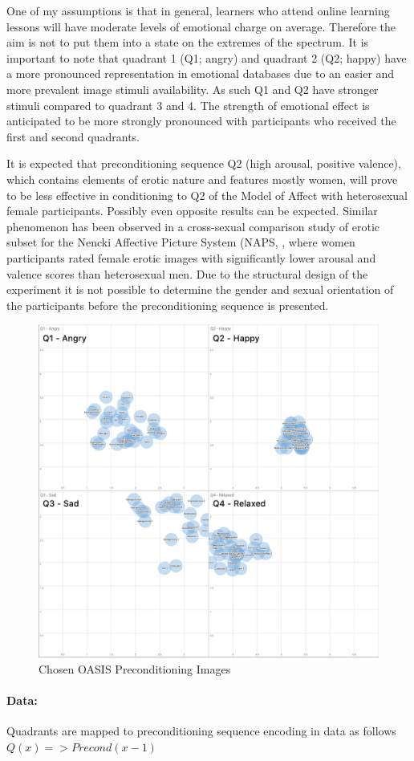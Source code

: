 One of my assumptions is that in general, learners who attend online learning lessons will have moderate levels of emotional charge on average. Therefore the aim is not to put them into a state on the extremes of the spectrum. It is important to note that quadrant 1 (Q1; angry) and quadrant 2 (Q2; happy) have a more pronounced representation in emotional databases due to an easier and more prevalent image stimuli availability. As such Q1 and Q2 have stronger stimuli compared to quadrant 3 and 4. The strength of emotional effect is anticipated to be more strongly pronounced with participants who received the first and second quadrants.

It is expected that preconditioning sequence Q2 (high arousal, positive valence), which contains elements of erotic nature and features mostly women, will prove to be less effective in conditioning to Q2 of the Model of Affect with heterosexual female participants. Possibly even opposite results can be expected. Similar phenomenon has been observed in a cross-sexual comparison study of erotic subset for the Nencki Affective Picture System (NAPS, \cite{Wierzba2015}, where women participants rated female erotic images with significantly lower arousal and valence scores than heterosexual men. Due to the structural design of the experiment it is not possible to determine the gender and sexual orientation of the participants before the preconditioning sequence is presented.






\begin{figure}[h!]
	\centering
	\includegraphics[width=1\linewidth]{graphics/All_Preconditionings}
	\caption{Chosen OASIS Preconditioning Images}
	\label{fig:allpreconditionings}
\end{figure}


\paragraph{Data:} Quadrants are mapped to preconditioning sequence encoding in data as follows \(Q(x) => Precond(x-1)\)